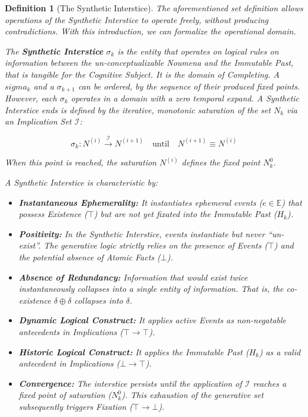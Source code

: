 \documentclass[11pt, a4paper]{article}
\theoremstyle{formalism}
\newtheorem{formalism}{Definition}
\begin{document}
\begin{formalism}[The Synthetic Interstice]

The aforementioned set definition allows operations of the Synthetic Interstice
to operate freely, without producing contradictions. With this introduction, we
can formalize the operational domain.

The \textbf{Synthetic Interstice} $\sigma_k$ is the entity that operates on
logical rules on information between the un-conceptualizable Noumena and
the Immutable Past, that is tangible for the Cognitive Subject. It is the
domain of \textit{Completing}. A $sigma_k$ and a $\sigma_{k+1}$ can be
ordered, by the sequence of their produced fixed points. However, each
$\sigma_k$ operates in a domain with a zero temporal expand. A Synthetic
Interstice ends  is defined by the iterative, monotonic saturation of the
set $N_k$ via an Implication Set $\mathcal{I}$:

\begin{equation}
    \sigma_k : N^{(i)} \xrightarrow{\mathcal{I}} N^{(i+1)} \quad \text{until} \quad N^{(i+1)} \equiv N^{(i)}
\end{equation}

When this point is reached, the saturation $N^{(i)}$ defines the fixed point $N^0_k$.

A Synthetic Interstice is characteristic by:
\begin{itemize}

    \item \textbf{Instantaneous Ephemerality:} It instantiates ephemeral 
       events ($e \in \mathbb{E}$) that possess Existence ($\top$) but are
       not yet fixated into the Immutable Past ($H_k$).

    \item \textbf{Positivity:} In the Synthetic Interstice, events instantiate 
        but never ``un-exist''. The generative logic strictly relies on the 
        presence of Events ($\top$) and the potential absence of Atomic Facts ($\bot$).

    \item \textbf{Absence of Redundancy:} Information that would exist twice
       instantaneously collapses into a single entity of information. That
       is, the co-existence $\delta \oplus \delta$ collapses into $\delta$.

    \item \textbf{Dynamic Logical Construct:} It applies active Events as
       non-negatable antecedents in Implications ($\top \rightarrow \top$).

    \item \textbf{Historic Logical Construct:} It applies the Immutable Past ($H_k$)
       as a valid antecedent in Implications ($\bot \rightarrow \top$).

    \item \textbf{Convergence:} The interstice persists until the application
       of $\mathcal{I}$ reaches a fixed point of saturation ($N^0_k$). This 
       exhaustion of the generative set subsequently triggers Fixation ($\top \rightarrow \bot$).

\end{itemize}
\end{formalism}
\end{document}
